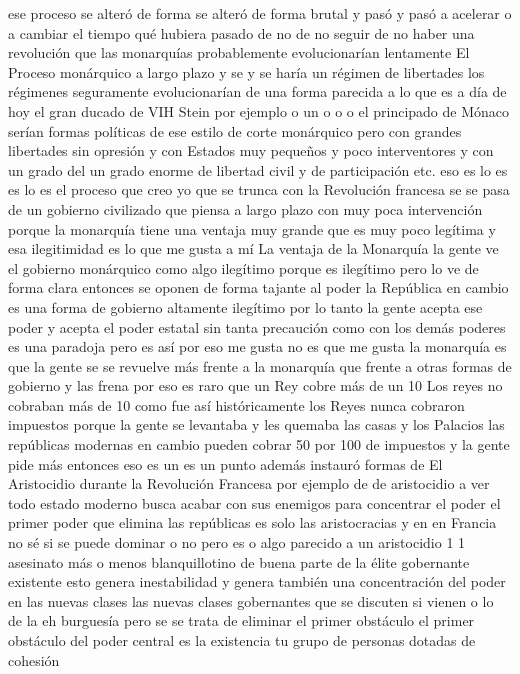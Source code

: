 ese proceso se alteró de forma se alteró de forma brutal y pasó y pasó a acelerar o a cambiar el tiempo
qué hubiera pasado de no de no seguir de no haber una revolución que las monarquías probablemente evolucionarían lentamente
El Proceso monárquico a largo plazo
y se y se haría un régimen de libertades los régimenes seguramente evolucionarían de una forma parecida a lo que es a día de hoy
el gran ducado de VIH Stein por ejemplo o un o o o el principado de Mónaco serían formas políticas de ese estilo
de corte monárquico pero con grandes libertades sin opresión y con Estados muy pequeños y poco interventores
y con un grado del un grado enorme de libertad civil y de participación etc. eso es lo es es lo es el proceso que creo yo que se trunca
con la Revolución francesa se se pasa de un gobierno civilizado que piensa a largo plazo con muy poca intervención
porque la monarquía tiene una ventaja muy grande que es muy poco legítima y esa ilegitimidad es lo que me gusta a mí
La ventaja de la Monarquía
la gente ve el gobierno monárquico como algo ilegítimo porque es ilegítimo
pero lo ve de forma clara entonces se oponen de forma tajante al poder la República en cambio es una forma de gobierno altamente ilegítimo
por lo tanto la gente acepta ese poder y acepta el poder estatal sin tanta precaución como con los demás poderes
es una paradoja pero es así por eso me gusta no es que me gusta la monarquía es que la gente se se revuelve más frente a la monarquía
que frente a otras formas de gobierno y las frena por eso es raro que un Rey cobre más de un 10%
Los reyes no cobraban más de 10%
como fue así históricamente los Reyes nunca cobraron impuestos porque la gente se levantaba y les quemaba las casas y los Palacios
las repúblicas modernas en cambio pueden cobrar 50 por 100 de impuestos
y la gente pide más entonces eso es un es un punto además instauró formas de
El Aristocidio durante la Revolución Francesa
por ejemplo de de aristocidio a ver todo estado moderno busca acabar con sus enemigos
para concentrar el poder el primer poder que elimina las repúblicas es solo las aristocracias
y en en Francia no sé si se puede dominar o no pero es o algo parecido a un aristocidio
1 1 asesinato más o menos blanquillotino de buena parte de la élite gobernante existente
esto genera inestabilidad y genera también una concentración del poder en las nuevas clases
las nuevas clases gobernantes que se discuten si vienen o lo de la eh burguesía
pero se se trata de eliminar el primer obstáculo el primer obstáculo del poder central es la existencia tu grupo de personas dotadas de cohesión
